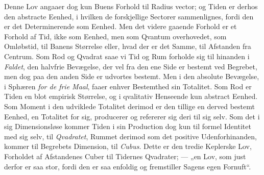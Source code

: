 \documentclass[12pt,a4paper]{book}
\begin{document}
Denne Lov angaaer dog kun Buens Forhold til Radius vector; og Tiden er derhos
den abstracte Eenhed, i hvilken de forskjellige Sectorer sammenlignes, fordi
den er det Determinerende som Eenhed. Men det videre gaaende Forhold er et
Forhold af Tid, ikke som Eenhed, men som Qvantum overhovedet, som Omløbstid,
til Banens Størrelse eller, hvad der er det Samme, til Afstanden fra Centrum.
Som Rod og Qvadrat saae vi Tid og Rum forholde sig til hinanden i
\emph{Faldet}, den halvfrie Bevægelse, der vel fra den ene Side er bestemt ved
Begrebet, men dog paa den anden Side er udvortes bestemt. Men i den absolute
Bevægelse, i Sphæren \emph{for de frie Maal}, faaer enhver Bestemthed sin
Totalitet. Som Rod er Tiden en blot empirisk Størrelse, og i qvalitativ
Henseende kun abstract Eenhed. Som Moment i den udviklede Totalitet derimod er
den tillige en derved bestemt Eenhed, en Totalitet for sig, producerer og
refererer sig deri til sig selv. Som det i sig Dimensionsløse kommer Tiden i
sin Production dog kun til formel Identitet med sig selv, til \emph{Qvadratet},
Rummet derimod som det positive Udenforhinanden, kommer til Begrebets
Dimension, til \emph{Cubus}. Dette er den tredie Keplerske Lov, Forholdet af
Afstandenes Cuber til Tidernes Qvadrater; --- „en Lov, som just derfor er saa
stor, fordi den er saa enfoldig og fremstiller Sagens egen Fornuft“.
\end{document}
